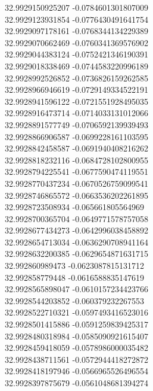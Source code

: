 {32.9929150925207	-0.0784601301807009\\
32.9929123931854	-0.0776430491641754\\
32.9929097178161	-0.0768344134229389\\
32.9929070662469	-0.0760341369576902\\
32.9929044383124	-0.0752421346190391\\
32.9929018338469	-0.0744583220996189\\
32.9928992526852	-0.0736826159262585\\
32.9928966946619	-0.0729149334522191\\
32.9928941596122	-0.0721551928495035\\
32.9928916473714	-0.0714033131012066\\
32.9928891577749	-0.0706592139939493\\
32.9928866906587	-0.0699228161103595\\
32.9928842458587	-0.0691940408216262\\
32.9928818232116	-0.0684728102800955\\
32.9928794225541	-0.0677590474119551\\
32.9928770437234	-0.0670526759099541\\
32.9928746865572	-0.0663536202261895\\
32.9928723508934	-0.065661805564969\\
32.9928700365704	-0.0649771578757058\\
32.9928677434273	-0.0642996038458892\\
32.9928654713034	-0.0636290708941164\\
32.9928632200385	-0.0629654871631715\\
32.992860989473	-0.0623087815131712\\
32.992858779448	-0.0616588835147619\\
32.9928565898047	-0.0610157234423766\\
32.9928544203852	-0.060379232267553\\
32.9928522710321	-0.0597493416523016\\
32.9928501415886	-0.0591259839425317\\
32.9928480318984	-0.0585090921615407\\
32.9928459418059	-0.0578986000035482\\
32.9928438711561	-0.0572944418272872\\
32.9928418197946	-0.0566965526496554\\
32.9928397875679	-0.0561048681394274\\
}
